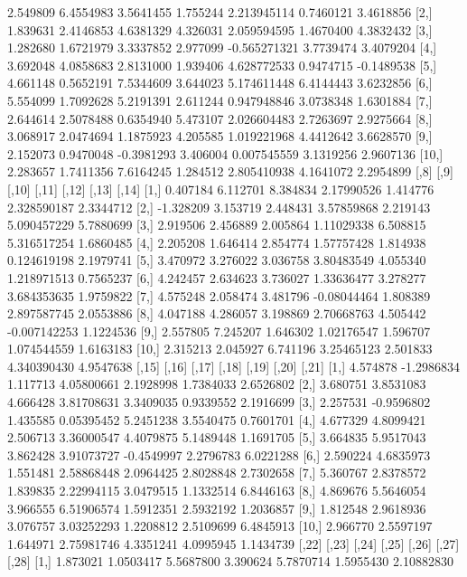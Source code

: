 \documentclass[12pt]{article}
\begin{document}
\begin{Schunk}
\begin{Soutput}
 [1,] 2.549809 6.4554983  3.5641455 1.755244  2.213945114 0.7460121  3.4618856
 [2,] 1.839631 2.4146853  4.6381329 4.326031  2.059594595 1.4670400  4.3832432
 [3,] 1.282680 1.6721979  3.3337852 2.977099 -0.565271321 3.7739474  3.4079204
 [4,] 3.692048 4.0858683  2.8131000 1.939406  4.628772533 0.9474715 -0.1489538
 [5,] 4.661148 0.5652191  7.5344609 3.644023  5.174611448 6.4144443  3.6232856
 [6,] 5.554099 1.7092628  5.2191391 2.611244  0.947948846 3.0738348  1.6301884
 [7,] 2.644614 2.5078488  0.6354940 5.473107  2.026604483 2.7263697  2.9275664
 [8,] 3.068917 2.0474694  1.1875923 4.205585  1.019221968 4.4412642  3.6628570
 [9,] 2.152073 0.9470048 -0.3981293 3.406004  0.007545559 3.1319256  2.9607136
[10,] 2.283657 1.7411356  7.6164245 1.284512  2.805410938 4.1641072  2.2954899
           [,8]     [,9]    [,10]       [,11]    [,12]        [,13]     [,14]
 [1,]  0.407184 6.112701 8.384834  2.17990526 1.414776  2.328590187 2.3344712
 [2,] -1.328209 3.153719 2.448431  3.57859868 2.219143  5.090457229 5.7880699
 [3,]  2.919506 2.456889 2.005864  1.11029338 6.508815  5.316517254 1.6860485
 [4,]  2.205208 1.646414 2.854774  1.57757428 1.814938  0.124619198 2.1979741
 [5,]  3.470972 3.276022 3.036758  3.80483549 4.055340  1.218971513 0.7565237
 [6,]  4.242457 2.634623 3.736027  1.33636477 3.278277  3.684353635 1.9759822
 [7,]  4.575248 2.058474 3.481796 -0.08044464 1.808389  2.897587745 2.0553886
 [8,]  4.047188 4.286057 3.198869  2.70668763 4.505442 -0.007142253 1.1224536
 [9,]  2.557805 7.245207 1.646302  1.02176547 1.596707  1.074544559 1.6163183
[10,]  2.315213 2.045927 6.741196  3.25465123 2.501833  4.340390430 4.9547638
         [,15]      [,16]    [,17]      [,18]      [,19]     [,20]     [,21]
 [1,] 4.574878 -1.2986834 1.117713 4.05800661  2.1928998 1.7384033 2.6526802
 [2,] 3.680751  3.8531083 4.666428 3.81708631  3.3409035 0.9339552 2.1916699
 [3,] 2.257531 -0.9596802 1.435585 0.05395452  5.2451238 3.5540475 0.7601701
 [4,] 4.677329  4.8099421 2.506713 3.36000547  4.4079875 5.1489448 1.1691705
 [5,] 3.664835  5.9517043 3.862428 3.91073727 -0.4549997 2.2796783 6.0221288
 [6,] 2.590224  4.6835973 1.551481 2.58868448  2.0964425 2.8028848 2.7302658
 [7,] 5.360767  2.8378572 1.839835 2.22994115  3.0479515 1.1332514 6.8446163
 [8,] 4.869676  5.5646054 3.966555 6.51906574  1.5912351 2.5932192 1.2036857
 [9,] 1.812548  2.9618936 3.076757 3.03252293  1.2208812 2.5109699 6.4845913
[10,] 2.966770  2.5597197 1.644971 2.75981746  4.3351241 4.0995945 1.1434739
          [,22]      [,23]     [,24]     [,25]      [,26]     [,27]       [,28]
 [1,]  1.873021  1.0503417 5.5687800  3.390624  5.7870714 1.5955430  2.10882830

\end{Soutput}
\end{Schunk}
\end{document}
